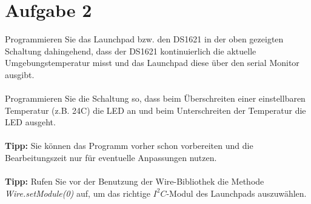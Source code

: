 \section{Aufgabe 2}
Programmieren Sie das Launchpad bzw. den DS1621 in der oben gezeigten Schaltung dahingehend, dass der DS1621 kontinuierlich die aktuelle Umgebungstemperatur misst und das Launchpad diese über den serial Monitor ausgibt.\\ \\
Programmieren Sie die Schaltung so, dass beim Überschreiten einer einstellbaren Temperatur (z.B. 24\textdegree{}C) die LED an und beim Unterschreiten der Temperatur die LED ausgeht.\\ \\
\textbf{Tipp:} Sie können das Programm vorher schon vorbereiten und die Bearbeitungszeit nur für eventuelle Anpassungen nutzen.\\ \\
\textbf{Tipp:} Rufen Sie vor der Benutzung der Wire-Bibliothek die Methode\\
\textit{Wire.setModule(0)} auf, um das richtige $I^2C$-Modul des Launchpads auszuwählen.\\ \\
